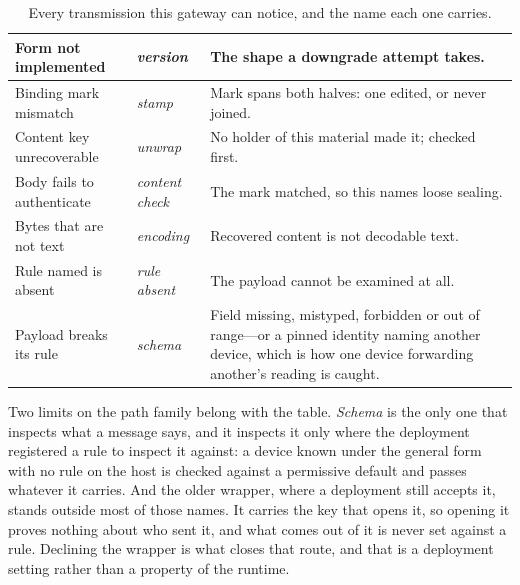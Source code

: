 \documentclass[12pt,a4paper]{report}
\begin{document}
\begin{table}[htbp]
{\begin{tabularx}{\textwidth}{@{}p{3.9cm}p{3.2cm}Y@{}}
\midrule
Form not implemented &
\emph{version} &
The shape a downgrade attempt takes. \\
\midrule
Binding mark mismatch &
\emph{stamp} &
Mark spans both halves: one edited, or never joined. \\
\midrule
Content key unrecoverable &
\emph{unwrap} &
No holder of this material made it; checked first. \\
\midrule
Body fails to authenticate &
\emph{content check} &
The mark matched, so this names loose sealing. \\
\midrule
Bytes that are not text &
\emph{encoding} &
Recovered content is not decodable text. \\
\midrule
Rule named is absent &
\emph{rule absent} &
The payload cannot be examined at all. \\
\midrule
Payload breaks its rule &
\emph{schema} &
Field missing, mistyped, forbidden or out of range---or a
pinned identity naming another device, which is how one device
forwarding another's reading is caught. \\
\bottomrule
\end{tabularx}}
\caption{Every transmission this gateway can notice, and the name each
one carries.}
\label{tab:gw-detect-kinds}
\end{table}

Two limits on the path family belong with the table. \emph{Schema} is the
only one that inspects what a message says, and it inspects it only where
the deployment registered a rule to inspect it against: a device known
under the general form with no rule on the host is checked against a
permissive default and passes whatever it carries. And the older wrapper,
where a deployment still accepts it, stands outside most of those names. It
carries the key that opens it, so opening it proves nothing about who sent
it, and what comes out of it is never set against a rule. Declining the
wrapper is what closes that route, and that is a deployment setting rather
than a property of the runtime.
\end{document}
